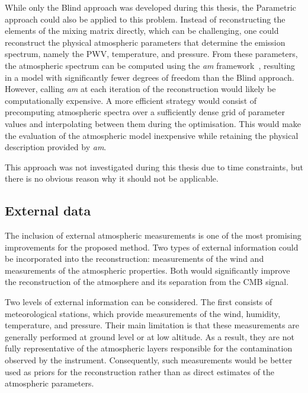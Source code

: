 \documentclass[../../thesis.tex]{subfiles}
\begin{document}
While only the Blind approach was developed during this thesis, the Parametric approach could also be applied to this problem. Instead of reconstructing the elements of the mixing matrix directly, which can be challenging, one could reconstruct the physical atmospheric parameters that determine the emission spectrum, namely the PWV, temperature, and pressure.
From these parameters, the atmospheric spectrum can be computed using the \emph{am} framework~\cite{paine2024}, resulting in a model with significantly fewer degrees of freedom than the Blind approach. However, calling \emph{am} at each iteration of the reconstruction would likely be computationally expensive. A more efficient strategy would consist of precomputing atmospheric spectra over a sufficiently dense grid of parameter values and interpolating between them during the optimisation. This would make the evaluation of the atmospheric model inexpensive while retaining the physical description provided by \emph{am}.

This approach was not investigated during this thesis due to time constraints, but there is no obvious reason why it should not be applicable.

\subsection{External data}

The inclusion of external atmospheric measurements is one of the most promising improvements for the proposed method. Two types of external information could be incorporated into the reconstruction: measurements of the wind and measurements of the atmospheric properties. Both would significantly improve the reconstruction of the atmosphere and its separation from the CMB signal.

Two levels of external information can be considered. The first consists of meteorological stations, which provide measurements of the wind, humidity, temperature, and pressure. Their main limitation is that these measurements are generally performed at ground level or at low altitude. As a result, they are not fully representative of the atmospheric layers responsible for the contamination observed by the instrument. Consequently, such measurements would be better used as priors for the reconstruction rather than as direct estimates of the atmospheric parameters.
\end{document}
